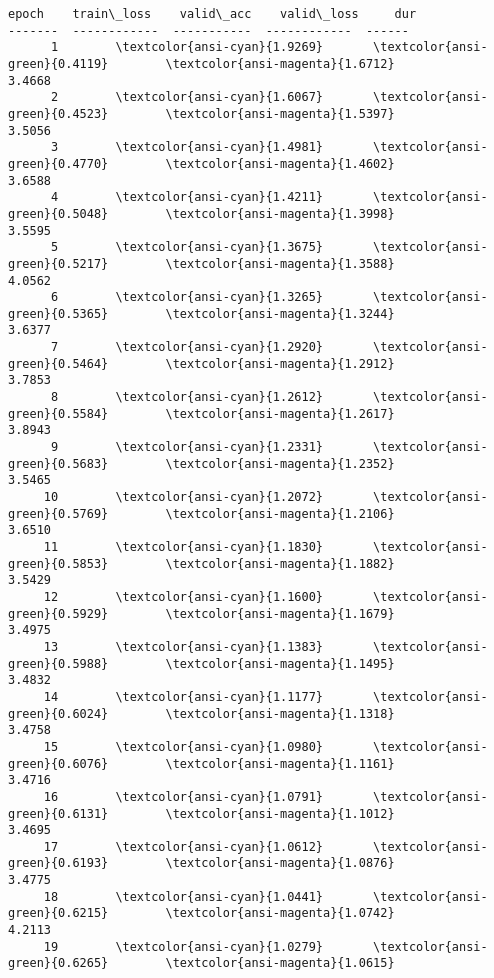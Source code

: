 \documentclass[11pt]{article}
\begin{document}
    \begin{Verbatim}[commandchars=\\\{\}]
  epoch    train\_loss    valid\_acc    valid\_loss     dur
-------  ------------  -----------  ------------  ------
      1        \textcolor{ansi-cyan}{1.9269}       \textcolor{ansi-green}{0.4119}        \textcolor{ansi-magenta}{1.6712}
3.4668
      2        \textcolor{ansi-cyan}{1.6067}       \textcolor{ansi-green}{0.4523}        \textcolor{ansi-magenta}{1.5397}
3.5056
      3        \textcolor{ansi-cyan}{1.4981}       \textcolor{ansi-green}{0.4770}        \textcolor{ansi-magenta}{1.4602}
3.6588
      4        \textcolor{ansi-cyan}{1.4211}       \textcolor{ansi-green}{0.5048}        \textcolor{ansi-magenta}{1.3998}
3.5595
      5        \textcolor{ansi-cyan}{1.3675}       \textcolor{ansi-green}{0.5217}        \textcolor{ansi-magenta}{1.3588}
4.0562
      6        \textcolor{ansi-cyan}{1.3265}       \textcolor{ansi-green}{0.5365}        \textcolor{ansi-magenta}{1.3244}
3.6377
      7        \textcolor{ansi-cyan}{1.2920}       \textcolor{ansi-green}{0.5464}        \textcolor{ansi-magenta}{1.2912}
3.7853
      8        \textcolor{ansi-cyan}{1.2612}       \textcolor{ansi-green}{0.5584}        \textcolor{ansi-magenta}{1.2617}
3.8943
      9        \textcolor{ansi-cyan}{1.2331}       \textcolor{ansi-green}{0.5683}        \textcolor{ansi-magenta}{1.2352}
3.5465
     10        \textcolor{ansi-cyan}{1.2072}       \textcolor{ansi-green}{0.5769}        \textcolor{ansi-magenta}{1.2106}
3.6510
     11        \textcolor{ansi-cyan}{1.1830}       \textcolor{ansi-green}{0.5853}        \textcolor{ansi-magenta}{1.1882}
3.5429
     12        \textcolor{ansi-cyan}{1.1600}       \textcolor{ansi-green}{0.5929}        \textcolor{ansi-magenta}{1.1679}
3.4975
     13        \textcolor{ansi-cyan}{1.1383}       \textcolor{ansi-green}{0.5988}        \textcolor{ansi-magenta}{1.1495}
3.4832
     14        \textcolor{ansi-cyan}{1.1177}       \textcolor{ansi-green}{0.6024}        \textcolor{ansi-magenta}{1.1318}
3.4758
     15        \textcolor{ansi-cyan}{1.0980}       \textcolor{ansi-green}{0.6076}        \textcolor{ansi-magenta}{1.1161}
3.4716
     16        \textcolor{ansi-cyan}{1.0791}       \textcolor{ansi-green}{0.6131}        \textcolor{ansi-magenta}{1.1012}
3.4695
     17        \textcolor{ansi-cyan}{1.0612}       \textcolor{ansi-green}{0.6193}        \textcolor{ansi-magenta}{1.0876}
3.4775
     18        \textcolor{ansi-cyan}{1.0441}       \textcolor{ansi-green}{0.6215}        \textcolor{ansi-magenta}{1.0742}
4.2113
     19        \textcolor{ansi-cyan}{1.0279}       \textcolor{ansi-green}{0.6265}        \textcolor{ansi-magenta}{1.0615}

\end{Verbatim}
\end{document}
